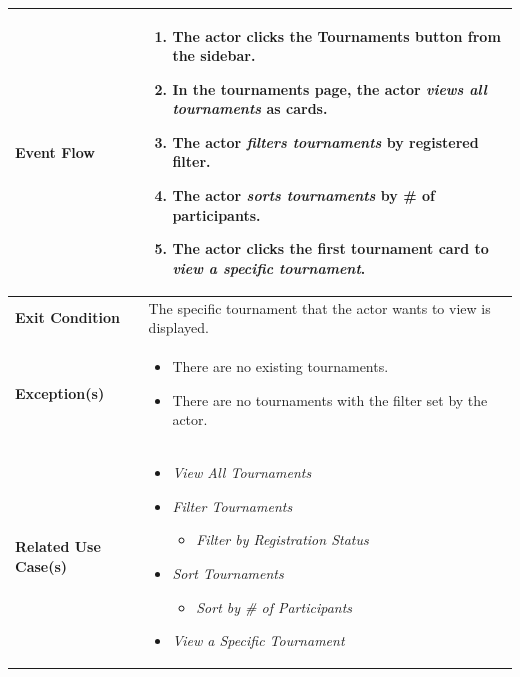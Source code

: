 \begin{enumerate}
\begin{center}
\begin{tabular}{ | m{10em} | m{10cm}| }
      \hline
      \textbf{Event Flow} & 
          \begin{enumerate}[(1)]
              \item The actor clicks the Tournaments button from the sidebar.
              \item In the tournaments page, the actor \textit{views all tournaments} as cards.
              \item The actor \textit{filters tournaments} by registered filter.
              \item The actor \textit{sorts tournaments} by \# of participants.
              \item The actor clicks the first tournament card to \textit{view a specific tournament}.
          \end{enumerate}
      \\ 
      \hline
      \textbf{Exit Condition} & The specific tournament that the actor wants to view is displayed.  \\ 
      \hline
      \textbf{Exception(s)} & 
      \begin{itemize}
          \item There are no existing tournaments.
          \item There are no tournaments with the filter set by the actor.
      \end{itemize}
          \\ 
      \hline
      \textbf{Related Use Case(s)} & 
      \begin{itemize}
          \item \textit{View All Tournaments}
          \item \textit{Filter Tournaments}
          \begin{itemize}
              \item \textit{Filter by Registration Status}
          \end{itemize}
          \item \textit{Sort Tournaments}
          \begin{itemize}
            \item \textit{Sort by \# of Participants}
          \end{itemize}
          \item \textit{View a Specific Tournament}
      \end{itemize}
          \\ 
      \hline
    \end{tabular}
            \label{tbl:uc3}
\end{center}


\end{enumerate}
